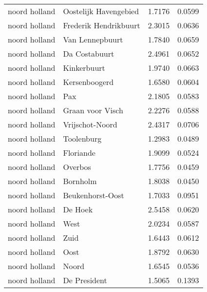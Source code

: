\begin{longtable}{llcc}
	noord holland & Oostelijk Havengebied   & 1.7176  & 0.0599                               \\
	noord holland & Frederik Hendrikbuurt   & 2.3015  & 0.0636                               \\
	noord holland & Van Lennepbuurt         & 1.7840  & 0.0659                               \\
	noord holland & Da Costabuurt           & 2.4961  & 0.0652                               \\
	noord holland & Kinkerbuurt             & 1.9740  & 0.0663                               \\
	noord holland & Kersenboogerd           & 1.6580  & 0.0604                               \\
	noord holland & Pax                     & 2.1805  & 0.0583                               \\
	noord holland & Graan voor Visch        & 2.2276  & 0.0588                               \\
	noord holland & Vrijschot-Noord         & 2.4317  & 0.0706                               \\
	noord holland & Toolenburg              & 1.2983  & 0.0489                               \\
	noord holland & Floriande               & 1.9099  & 0.0524                               \\
	noord holland & Overbos                 & 1.7756  & 0.0459                               \\
	noord holland & Bornholm                & 1.8038  & 0.0450                               \\
	noord holland & Beukenhorst-Oost        & 1.7033  & 0.0951                               \\
	noord holland & De Hoek                 & 2.5458  & 0.0620                               \\
	noord holland & West                    & 2.0234  & 0.0587                               \\
	noord holland & Zuid                    & 1.6443  & 0.0612                               \\
	noord holland & Oost                    & 1.8792  & 0.0630                               \\
	noord holland & Noord                   & 1.6545  & 0.0536                               \\
	noord holland & De President            & 1.5065  & 0.1393                               \\

\end{longtable}
